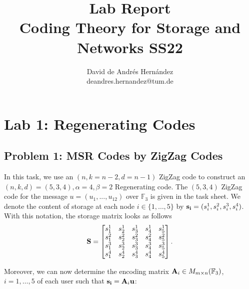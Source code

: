 \documentclass{article}
\title{Lab Report\\
\large Coding Theory for Storage and Networks SS22}
\author{David de Andrés Hernández\\
\small deandres.hernandez@tum.de}
\date{} %
\begin{document}
\maketitle


\section*{Lab 1: Regenerating Codes}
\subsection*{Problem 1: MSR Codes by ZigZag Codes}
In this task, we use an $(n,k = n-2, d=n-1)$ ZigZag code to construct an $(n, k, d) = (5,3,4), \alpha =4 , \beta = 2$ Regenerating code. The $(5, 3, 4)$ ZigZag code for the message $u = (u_1,..., u_{12})$ over $\mathbb{F}_3$ is given  in the task sheet.
\noindent We denote the content of storage at each node $i \in \{1,\ldots, 5\}$ by $\vb{s_i}= (s_i^1, s_i^2, s_i^3, s_i^4)$. With this notation, the storage matrix looks as follows
\begin{equation*}
\vb{S} = 
\begin{bmatrix}
s_1^1 & s_2^1 & s_3^1 & s_4^1 & s_5^1 \\
s_1^2 & s_2^2 & s_3^2 & s_4^2 & s_5^2 \\
s_1^3 & s_2^3 & s_3^3 & s_4^3 & s_5^3 \\
s_1^4 & s_2^4 & s_3^4 & s_4^4 & s_5^4
\end{bmatrix}.
\end{equation*}

Moreover, we can now determine the encoding matrix $\vb{A}_i \in M_{m \times n}(\mathbb{F}_3)$, $i = 1, \ldots,5$ of each user such that $\vb{s_i}= \vb{A}_i\vb{u}$:
\end{document}
